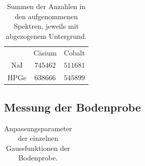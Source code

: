 \begin{table}[h]
    \centering
    \begin{tabular}{|c|cc|}\hline
	& Cäsium & Cobalt \\
	NaI & $\num{745462}$ & $\num{511681}$\\
	HPGe & $\num{638666}$ & $\num{545899}$\\ \hline
    \end{tabular}
    \caption{Summen der Anzahlen in den aufgenommenen Spektren, jeweils mit abgezogenem Untergrund.}
    \label{tab:sum_counts}
\end{table}

\subsection{Messung der Bodenprobe}

\begin{table}[H]
    \centering
    \begin{tabular}{|c|c|c|c|c|} \hline
    
    \end{tabular}
    \caption{Anpassungsparameter der einzelnen Gaussfunktionen der Bodenprobe.}
    \label{tab:bodenprobe_peaks}
\end{table}
